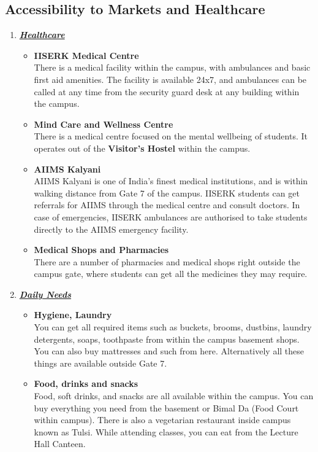 \documentclass[openany]{book}
\begin{document}
\subsection{Accessibility to Markets and Healthcare}
\begin{enumerate}
    \item \underline{\textbf{\textit{Healthcare}}}
    \begin{itemize}
        \item \textbf{IISERK Medical Centre} \\
        There is a medical facility within the campus, with ambulances and basic first aid amenities. The facility is available 24x7, and ambulances can be called at any time from the security guard desk at any building within the campus.
        \item \textbf{Mind Care and Wellness Centre} \\
        There is a medical centre focused on the mental wellbeing of students. It operates out of the \textbf{Visitor's Hostel} within the campus. 
        \item \textbf{AIIMS Kalyani} \\
        AIIMS Kalyani is one of India's finest medical institutions, and is within walking distance from Gate 7 of the campus. IISERK students can get referrals for AIIMS through the medical centre and consult doctors. In case of emergencies, IISERK ambulances are authorised to take students directly to the AIIMS emergency facility.
        \item \textbf{Medical Shops and Pharmacies} \\
        There are a number of pharmacies and medical shops right outside the campus gate, where students can get all the medicines they may require. 
    \end{itemize}
    \item \underline{\textbf{\textit{Daily Needs}}}
    \begin{itemize}
        \item \textbf{Hygiene, Laundry} \\ 
        You can get all required items such as buckets, brooms, dustbins, laundry detergents, soaps, toothpaste from within the campus basement shops. You can also buy mattresses and such from here. Alternatively all these things are available outside Gate 7. 
        \item \textbf{Food, drinks and snacks} \\
        Food, soft drinks, and snacks are all available within the campus. You can buy everything you need from the basement or Bimal Da (Food Court within campus). There is also a vegetarian restaurant inside campus known as Tulsi. While attending classes, you can eat from the Lecture Hall Canteen. \\

\end{itemize}
\end{enumerate}
\end{document}
